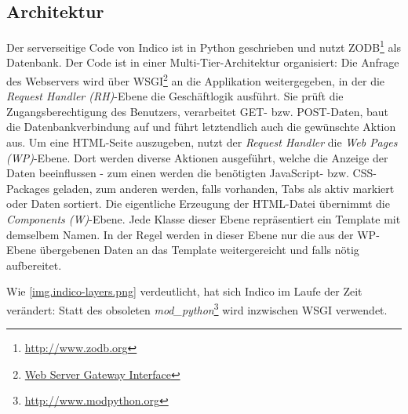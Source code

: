 \subsection{Architektur}
Der serverseitige Code von Indico ist in Python geschrieben und nutzt
ZODB\footnote{\href{http://www.zodb.org}{http://www.zodb.org}} als Datenbank. Der Code ist in einer
Multi-Tier-Architektur organisiert: Die Anfrage des Webservers wird über
WSGI\footnote{\href{http://www.python.org/dev/peps/pep-0333/}{Web Server Gateway Interface}} an die
Applikation weitergegeben, in der die \emph{Request Handler (RH)}-Ebene die Geschäftlogik ausführt.
Sie prüft die Zugangsberechtigung des Benutzers, verarbeitet GET- bzw. POST-Daten, baut die
Datenbankverbindung auf und führt letztendlich auch die gewünschte Aktion aus. Um eine HTML-Seite
auszugeben, nutzt der \emph{Request Handler} die \emph{Web Pages (WP)}-Ebene. Dort werden diverse
Aktionen ausgeführt, welche die Anzeige der Daten beeinflussen - zum einen werden die benötigten
JavaScript- bzw. CSS-Packages geladen, zum anderen werden, falls vorhanden, Tabs als aktiv markiert
oder Daten sortiert. Die eigentliche Erzeugung der HTML-Datei übernimmt die \emph{Components
(W)}-Ebene. Jede Klasse dieser Ebene repräsentiert ein Template mit demselbem Namen. In der Regel
werden in dieser Ebene nur die aus der WP-Ebene übergebenen Daten an das Template weitergereicht und
falls nötig aufbereitet.

Wie \autoref{img.indico-layers.png} verdeutlicht, hat sich Indico im Laufe der Zeit verändert: Statt
des obsoleten \emph{mod\_python}\footnote{\href{http://www.modpython.org}{http://www.modpython.org}}
wird inzwischen WSGI verwendet.

